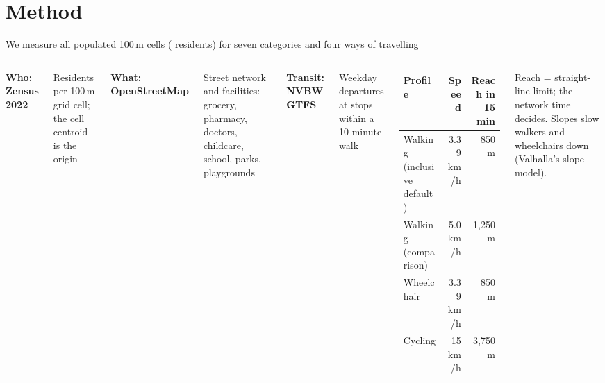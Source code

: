 \documentclass[aspectratio=169,10pt]{beamer}
\begin{document}
\section{Method}

\begin{frame}{We measure all \factCells{} populated 100\,m cells (\factResidents{} residents)
  for seven categories and four ways of travelling}
  \begin{columns}[T,onlytextwidth]
      \textbf{Who: Zensus 2022}\par\smallskip
      \footnotesize Residents per 100\,m grid cell; the cell centroid is the origin\par
      \bigskip\normalsize
      \textbf{What: OpenStreetMap}\par\smallskip
      \footnotesize Street network and facilities: grocery, pharmacy, doctors, childcare,
      school, parks, playgrounds\par
      \bigskip\normalsize
      \textbf{Transit: NVBW GTFS}\par\smallskip
      \footnotesize Weekday departures at stops within a 10-minute walk
      \centering
      \footnotesize
      \begin{tabular}{@{}lrr@{}}
        \toprule
        Profile & Speed & Reach in 15 min \\
        \midrule
        Walking (inclusive default) & 3.39 km/h & 850 m \\
        Walking (comparison) & 5.0 km/h & 1,250 m \\
        Wheelchair & 3.39 km/h & 850 m \\
        Cycling & 15 km/h & 3,750 m \\
        \bottomrule
      \end{tabular}\par\medskip
      \raggedright
      Reach = straight-line limit; the network time decides. Slopes slow walkers and
      wheelchairs down (Valhalla's slope model).
  \end{columns}
\end{frame}
\end{document}
